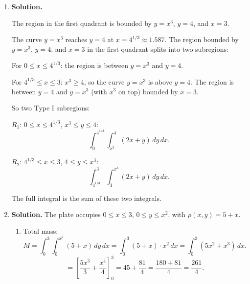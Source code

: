 \begin{enumerate}
\item \textbf{Solution.}
\begin{center}
\end{center}
The region in the first quadrant is bounded by $y=x^3$, $y=4$, and $x=3$.

The curve $y=x^3$ reaches $y=4$ at $x=4^{1/3}\approx 1.587$. The region bounded by $y=x^3$, $y=4$, and $x=3$ in the first quadrant splits into two subregions:

For $0\le x\le 4^{1/3}$: the region is between $y=x^3$ and $y=4$.

For $4^{1/3}\le x\le 3$: $x^3\ge 4$, so the curve $y=x^3$ is above $y=4$. The region is between $y=4$ and $y=x^3$ (with $x^3$ on top) bounded by $x=3$.

So two Type I subregions:

$R_1$: $0\le x\le 4^{1/3}$, $x^3\le y\le 4$:
\[
\int_0^{4^{1/3}}\int_{x^3}^4(2x+y)\,dy\,dx.
\]

$R_2$: $4^{1/3}\le x\le 3$, $4\le y\le x^3$:
\[
\int_{4^{1/3}}^3\int_4^{x^3}(2x+y)\,dy\,dx.
\]

The full integral is the sum of these two integrals.

\item \textbf{Solution.}
The plate occupies $0\le x\le 3$, $0\le y\le x^2$, with $\rho(x,y) = 5+x$.

\begin{enumerate}
\item Total mass:
\[
M = \int_0^3\int_0^{x^2}(5+x)\,dy\,dx = \int_0^3(5+x)\cdot x^2\,dx = \int_0^3(5x^2+x^3)\,dx.
\]
\[
= \left[\frac{5x^3}{3}+\frac{x^4}{4}\right]_0^3 = 45+\frac{81}{4} = \frac{180+81}{4} = \frac{261}{4}.
\]


\end{enumerate}
\end{enumerate}
